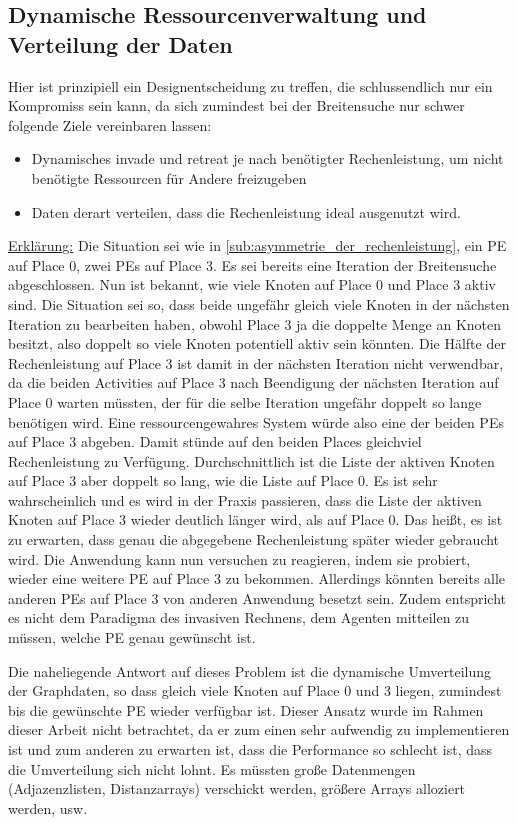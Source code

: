 \subsection{Dynamische Ressourcenverwaltung und Verteilung der Daten} %
\label{sub:dynamische_ressourcenverwaltung}
Hier ist prinzipiell ein Designentscheidung zu treffen, die schlussendlich nur ein Kompromiss sein kann, da sich zumindest bei der Breitensuche nur schwer folgende Ziele vereinbaren lassen:
\begin{itemize}
	\item Dynamisches invade und retreat je nach benötigter Rechenleistung, um nicht benötigte Ressourcen für Andere freizugeben
	\item Daten derart verteilen, dass die Rechenleistung ideal ausgenutzt wird.
\end{itemize}
\underline{Erklärung:} Die Situation sei wie in \ref{sub:asymmetrie_der_rechenleistung}, ein PE auf Place 0, zwei PEs auf Place 3. Es sei bereits eine Iteration der Breitensuche abgeschlossen. Nun ist bekannt, wie viele Knoten auf Place 0 und Place 3 aktiv sind. Die Situation sei so, dass beide ungefähr gleich viele Knoten in der nächsten Iteration zu bearbeiten haben, obwohl Place 3 ja die doppelte Menge an Knoten besitzt, also doppelt so viele Knoten potentiell aktiv sein könnten. Die Hälfte der Rechenleistung auf Place 3 ist damit in der nächsten Iteration nicht verwendbar, da die beiden Activities auf Place 3 nach Beendigung der nächsten Iteration auf Place 0 warten müssten, der für die selbe Iteration ungefähr doppelt so lange benötigen wird. Eine ressourcengewahres System würde also eine der beiden PEs auf Place 3 abgeben. Damit stünde auf den beiden Places gleichviel Rechenleistung zu Verfügung. Durchschnittlich ist die Liste der aktiven Knoten auf Place 3 aber doppelt so lang, wie die Liste auf Place 0. Es ist sehr wahrscheinlich und es wird in der Praxis passieren, dass die Liste der aktiven Knoten auf Place 3 wieder deutlich länger wird, als auf Place 0. Das heißt, es ist zu erwarten, dass genau die abgegebene Rechenleistung später wieder gebraucht wird. Die Anwendung kann nun versuchen zu reagieren, indem sie probiert, wieder eine weitere PE auf Place 3 zu bekommen. Allerdings könnten bereits alle anderen PEs auf Place 3 von anderen Anwendung besetzt sein. Zudem entspricht es nicht dem Paradigma des invasiven Rechnens, dem Agenten mitteilen zu müssen, welche PE genau gewünscht ist.

Die naheliegende Antwort auf dieses Problem ist die dynamische Umverteilung der Graphdaten, so dass gleich viele Knoten auf Place 0 und 3 liegen, zumindest bis die gewünschte PE wieder verfügbar ist. Dieser Ansatz wurde im Rahmen dieser Arbeit nicht betrachtet, da er zum einen sehr aufwendig zu implementieren ist und zum anderen zu erwarten ist, dass die Performance so schlecht ist, dass die Umverteilung sich nicht lohnt. Es müssten große Datenmengen (Adjazenzlisten, Distanzarrays) verschickt werden, größere Arrays alloziert werden, usw.


